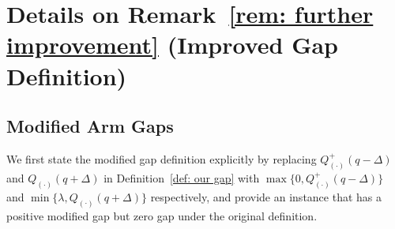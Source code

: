 \section{Details on Remark~\ref{rem: further improvement} (Improved Gap Definition)}
\label{sec: appendix potential improvement}

\subsection{Modified Arm Gaps}
We first state the modified gap definition explicitly by replacing $Q^+_{(\cdot)}(q - \Delta)$ and $Q_{(\cdot)}(q + \Delta)$ in Definition~\ref{def: our gap}
    with $\max\big\{0, Q^+_{(\cdot)}(q - \Delta)\big\}$ and $\min\big\{\lambda, Q_{(\cdot)}(q + \Delta)\big\}$ respectively, and provide an instance that has a positive modified gap but zero gap under the original definition.
    
